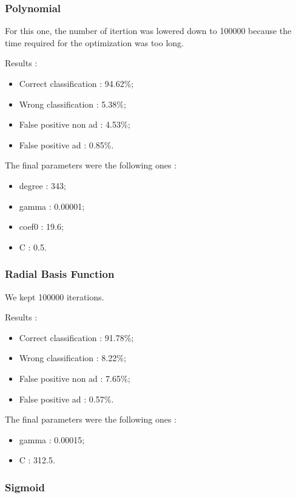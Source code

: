\subsubsection{Polynomial}

For this one, the number of itertion was lowered down to 100000 because the time required for the optimization was too long.

Results :
\begin{itemize}
  \item Correct classification : 94.62\%;
  \item Wrong classification : 5.38\%;
  \item False positive non ad : 4.53\%;
  \item False positive ad : 0.85\%.
\end{itemize}

The final parameters were the following ones :
\begin{itemize}
  \item degree : 343;
  \item gamma : 0.00001;
  \item coef0 : 19.6;
  \item C : 0.5.
\end{itemize}


\subsubsection{Radial Basis Function}

We kept 100000 iterations.

Results :
\begin{itemize}
  \item Correct classification : 91.78\%;
  \item Wrong classification : 8.22\%;
  \item False positive non ad : 7.65\%;
  \item False positive ad : 0.57\%.
\end{itemize}

The final parameters were the following ones :
\begin{itemize}
  \item gamma : 0.00015;
  \item C : 312.5.
\end{itemize}


\subsubsection{Sigmoid}

